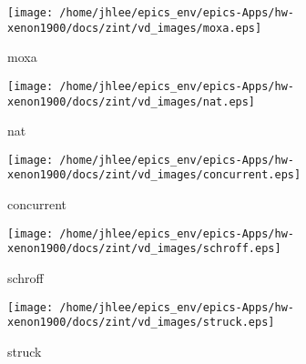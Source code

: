 \noindent
\vspace{1.4cm}
\begin{minipage}{.2\textwidth}
\begin{center}
\texttt{[image: /home/jhlee/epics\_env/epics-Apps/hw-xenon1900/docs/zint/vd\_images/moxa.eps]}
\end{center}
\end{minipage}
\begin{minipage}{.7\textwidth}
moxa
\end{minipage}


\noindent
\vspace{1.4cm}
\begin{minipage}{.2\textwidth}
\begin{center}
\texttt{[image: /home/jhlee/epics\_env/epics-Apps/hw-xenon1900/docs/zint/vd\_images/nat.eps]}
\end{center}
\end{minipage}
\begin{minipage}{.7\textwidth}
nat
\end{minipage}


\noindent
\vspace{1.4cm}
\begin{minipage}{.2\textwidth}
\begin{center}
\texttt{[image: /home/jhlee/epics\_env/epics-Apps/hw-xenon1900/docs/zint/vd\_images/concurrent.eps]}
\end{center}
\end{minipage}
\begin{minipage}{.7\textwidth}
concurrent
\end{minipage}


\noindent
\vspace{1.4cm}
\begin{minipage}{.2\textwidth}
\begin{center}
\texttt{[image: /home/jhlee/epics\_env/epics-Apps/hw-xenon1900/docs/zint/vd\_images/schroff.eps]}
\end{center}
\end{minipage}
\begin{minipage}{.7\textwidth}
schroff
\end{minipage}


\noindent
\vspace{1.4cm}
\begin{minipage}{.2\textwidth}
\begin{center}
\texttt{[image: /home/jhlee/epics\_env/epics-Apps/hw-xenon1900/docs/zint/vd\_images/struck.eps]}
\end{center}
\end{minipage}
\begin{minipage}{.7\textwidth}
struck
\end{minipage}


